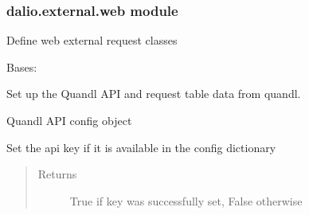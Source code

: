 \documentclass[letterpaper,10pt,english]{sphinxmanual}
\begin{document}
\subsubsection{dalio.external.web module}
\label{\detokenize{dalio.external:module-dalio.external.web}}\label{\detokenize{dalio.external:dalio-external-web-module}}
Define web external request classes

\begin{fulllineitems}
\label{\detokenize{dalio.external:dalio.external.web.QuandlAPI}}
Bases: {\hyperref[\detokenize{dalio.external:dalio.external.external.External}]{}}

Set up the Quandl API and request table data from quandl.

\begin{fulllineitems}
\label{\detokenize{dalio.external:dalio.external.web.QuandlAPI._quandl_conf}}
Quandl API config object

\end{fulllineitems}


\begin{fulllineitems}
\label{\detokenize{dalio.external:dalio.external.web.QuandlAPI.authenticate}}
Set the api key if it is available in the config dictionary
\begin{quote}\begin{description}
\item[{Returns}] \leavevmode
True if key was successfully set, False otherwise

\end{description}\end{quote}


\end{fulllineitems}
\end{fulllineitems}
\end{document}
